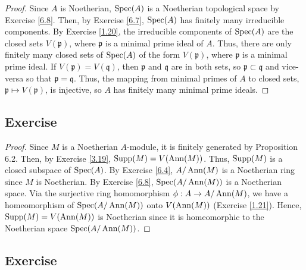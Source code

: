 \begin{proof}
Since $A$ is Noetherian, $\operatorname{Spec}(A)$ is a Noetherian topological space by Exercise \ref{6.8}. Then, by Exercise \ref{6.7}, $\operatorname{Spec}(A)$ has finitely many 
irreducible components. By Exercise \ref{1.20}, the irreducible components of $\operatorname{Spec}(A)$ are the closed sets $V(\mathfrak{p})$, where $\mathfrak{p}$ is a 
minimal prime ideal of $A$. Thus, there are only finitely many closed sets of $\operatorname{Spec}(A)$ of the form $V(\mathfrak{p})$, where $\mathfrak{p}$ is a minimal
prime ideal. If $V(\mathfrak{p}) = V(\mathfrak{q})$, then $\mathfrak{p}$ and $\mathfrak{q}$ are in both sets, so $\mathfrak{p} \subset \mathfrak{q}$ and
vice-versa so that $\mathfrak{p} = \mathfrak{q}$. Thus, the mapping from minimal primes of $A$ to closed sets, $\mathfrak{p} \mapsto V(\mathfrak{p})$, is
injective, so $A$ has finitely many minimal prime ideals.
\end{proof}

\subsection{Exercise}\label{6.10}

\begin{proof}
Since $M$ is a Noetherian $A$-module, it is finitely generated by Proposition 6.2. Then, by Exercise \ref{3.19}, $\operatorname{Supp}(M) = V(\operatorname{Ann}(M))$. Thus,
$\operatorname{Supp}(M)$ is a closed subspace of $\operatorname{Spec}(A)$. By Exercise \ref{6.4}, $A/\operatorname{Ann}(M)$ is a Noetherian ring since $M$ is Noetherian. By Exercise \ref{6.8},
$\operatorname{Spec}(A/\operatorname{Ann}(M))$ is a Noetherian space. Via the surjective ring homomorphism $\phi : A \to A/\operatorname{Ann}(M)$, we have a homeomorphism of $\operatorname{Spec}(A/\operatorname{Ann}(M))$
onto $V(\operatorname{Ann}(M))$ (Exercise \ref{1.21}). Hence, $\operatorname{Supp}(M) = V(\operatorname{Ann}(M))$ is Noetherian since it is homeomorphic to the Noetherian space $\operatorname{Spec}(A/\operatorname{Ann}(M))$.
\end{proof}

\subsection{Exercise}\label{6.11}

